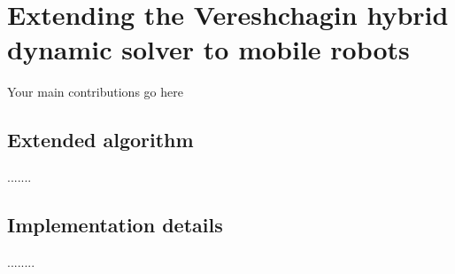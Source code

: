 
\chapter{Extending the Vereshchagin hybrid dynamic solver to mobile robots}



Your main contributions go here

\section{Extended algorithm}{.......}


\section{Implementation details}{........}

